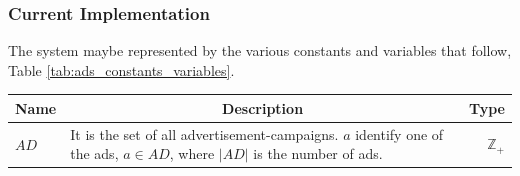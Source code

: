 \subsubsection{Current Implementation}
The system maybe represented by the various constants and variables that follow, Table \ref{tab:ads_constants_variables}.
\begin{table}[!ht]
	\begin{tabular}{|p{0.7cm}|p{5.8cm}|r| }
		\hline
			\multicolumn{1}{|c|}{Name} & \multicolumn{1}{c|}{Description} & \multicolumn{1}{c|}{Type} \\
		\hline
		\hline
			$AD$ & It is the set of all advertisement-campaigns. $a$ identify one of the ads, $a \in AD$, where $|AD|$ is the number of ads. & $\mathbb{Z}_{+}$ \\
		\hline
	\end{tabular}
	\vspace{.1cm}


\end{table}
